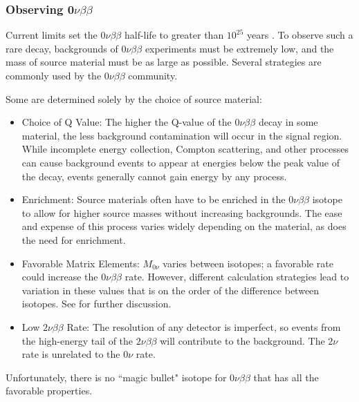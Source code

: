 \subsubsection{Observing 0$\nu\beta\beta$}
Current limits set the $0\nu\beta\beta$ half-life to greater than $10^{25}$ years \cite{EXO2014}. To observe such a rare decay, backgrounds of $0\nu\beta\beta$ experiments must be extremely low, and the mass of source material must be as large as possible. Several strategies are commonly used by the $0\nu\beta\beta$ community. 

Some are determined solely by the choice of source material:
\begin{itemize}
\item Choice of Q Value: The higher the Q-value of the $0\nu\beta\beta$ decay in some material, the less background contamination will occur in the signal region. While incomplete energy collection, Compton scattering, and other processes can cause background events to appear at energies below the peak value of the decay, events generally cannot gain energy by any process. 
\item Enrichment: Source materials often have to be enriched in the $0\nu\beta\beta$ isotope to allow for higher source masses without increasing backgrounds. The ease and expense of this process varies widely depending on the material, as does the need for enrichment.
\item Favorable Matrix Elements: $M_{0\nu}$ varies between isotopes; a favorable rate could increase the $0\nu\beta\beta$ rate. However, different calculation strategies lead to variation in these values that is on the order of the difference between isotopes. See \cite{Simkovic2009} for further discussion. 
\item Low $2\nu\beta\beta$ Rate: The resolution of any detector is imperfect, so events from the high-energy tail of the $2\nu\beta\beta$ will contribute to the background. The $2\nu$ rate is unrelated to the $0\nu$ rate.
\end{itemize} 
Unfortunately, there is no ``magic bullet" isotope for $0\nu\beta\beta$ that has all the favorable properties. 

